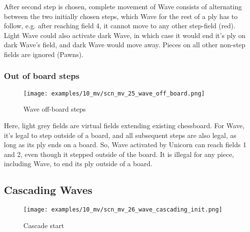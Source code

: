 After second step is chosen, complete movement of Wave consists of alternating between the two initially
chosen steps, which Wave for the rest of a ply has to follow, e.g. after reaching field 4, it cannot move
to any other step-field (red). Light Wave could also activate dark Wave, in which case it would end it's
ply on dark Wave's field, and dark Wave would move away. Pieces on all other non-step fields are ignored
(Pawns).

\clearpage %

\subsubsection*{Out of board steps}
\label{sec:Miranda's veil/Wave/Movement/Out of board steps}

\vspace*{-1.4\baselineskip}
\noindent
\begin{figure}[!h]
\texttt{[image: examples/10\_mv/scn\_mv\_25\_wave\_off\_board.png]}
\caption{Wave off-board steps}
\label{fig:scn_mv_25_wave_off_board}
\end{figure}

Here, light grey fields are virtual fields extending existing chessboard.
For Wave, it's legal to step outside of a board, and all subsequent steps
are also legal, as long as its ply ends on a board. So, Wave activated by
Unicorn can reach fields 1 and 2, even though it stepped outside of the
board. It is illegal for any piece, including Wave, to end its ply outside
of a board.

\clearpage %

\subsection*{Cascading Waves}
\label{sec:Miranda's veil/Wave/Cascading Waves}

\vspace*{-1.4\baselineskip}
\noindent
\begin{figure}[h]
\texttt{[image: examples/10\_mv/scn\_mv\_26\_wave\_cascading\_init.png]}
\caption{Cascade start}
\label{fig:scn_mv_26_wave_cascading_init}
\end{figure}

